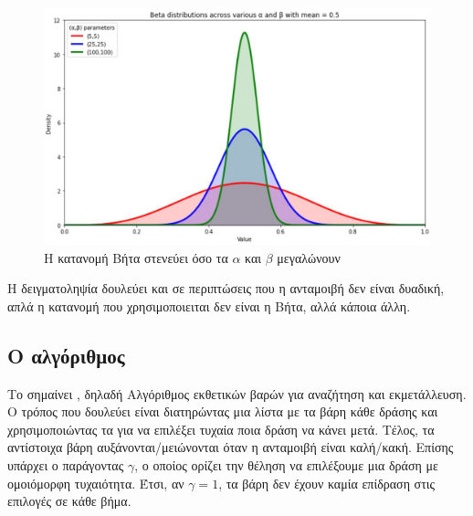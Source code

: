 \begin{figure}
    \centering
    \includegraphics[width=\textwidth]{body_matter/bandits/images/beta-distribution.jpg}
    \caption{Η κατανομή Βήτα στενεύει όσο τα $α$ και $β$ μεγαλώνουν}
    \label{fig:beta_distribution}
\end{figure}

Η δειγματοληψία  δουλεύει και σε περιπτώσεις που η ανταμοιβή δεν είναι δυαδική, απλά η κατανομή που χρησιμοποιειται δεν είναι η Βήτα, αλλά κάποια άλλη.

\subsection{Ο αλγόριθμος }

Το  σημαίνει , δηλαδή Αλγόριθμος εκθετικών βαρών για αναζήτηση και εκμετάλλευση. Ο τρόπος που δουλεύει είναι διατηρώντας μια λίστα με τα βάρη κάθε δράσης και χρησιμοποιώντας τα για να επιλέξει τυχαία ποια δράση να κάνει μετά. Τέλος, τα αντίστοιχα βάρη αυξάνονται/μειώνονται όταν η ανταμοιβή είναι καλή/κακή. Επίσης υπάρχει ο παράγοντας $γ$, ο οποίος ορίζει την θέληση να επιλέξουμε μια δράση με ομοιόμορφη τυχαιότητα. Έτσι, αν $γ=1$, τα βάρη δεν έχουν καμία επίδραση στις επιλογές σε κάθε βήμα.

